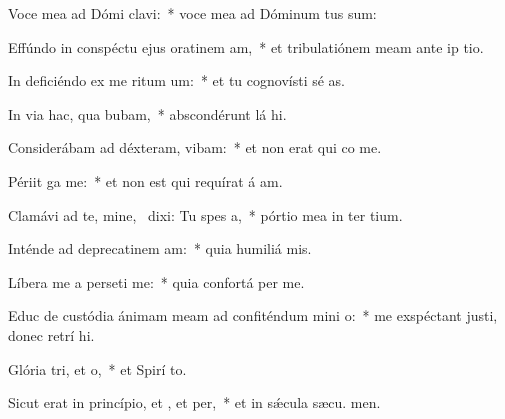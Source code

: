 \item Voce mea ad Dómi clavi:~* voce mea ad Dóminum tus sum:
\item Effúndo in conspéctu ejus oratinem am,~* et tribulatiónem meam ante ip tio.
\item In deficiéndo ex me ritum um:~* et tu cognovísti sé as.
\item In via hac, qua bubam,~* abscondérunt lá hi.
\item Considerábam ad déxteram,  vibam:~* et non erat qui co me.
\item Périit ga  me:~* et non est qui requírat á am.
\item Clamávi ad te, mine,~\pscross{} dixi: Tu  spes a,~* pórtio mea in ter tium.
\item Inténde ad deprecatinem am:~* quia humiliá  mis.
\item Líbera me a perseti me:~* quia confortá  per me.
\item Educ de custódia ánimam meam ad confiténdum mini o:~* me exspéctant justi, donec retrí hi.
\item Glória tri, et o,~* et Spirí to.
\item Sicut erat in princípio, et , et per,~* et in sǽcula sæcu. men.
